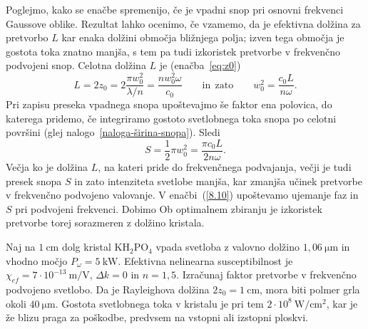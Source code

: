Poglejmo, kako se enačbe spremenijo, če je vpadni snop pri osnovni 
frekvenci Gaussove oblike. 
Rezultat lahko ocenimo, če vzamemo, da je
efektivna dolžina za pretvorbo $L$ kar enaka dolžini območja bližnjega polja; izven tega območja je 
gostota toka znatno manjša, s tem pa tudi izkoristek pretvorbe v 
frekvenčno podvojeni snop.
Celotna  dolžina $L$ je (enačba~\ref{eq:z0})
\begin{equation}
L=2z_{0}=2\frac{\pi w_{0}^{2}}{\lambda/n} = \frac{n w_0^2 \omega}{c_0}  \qquad \mathrm{in~~zato} \qquad 
w_{0}^{2} = \frac{c_0 L}{n \omega}.
\label{SHGG}
\end{equation}
Pri zapisu preseka vpadnega snopa upoštevajmo še faktor ena polovica, do katerega 
pridemo, če integriramo gostoto svetlobnega toka
snopa po celotni površini (glej nalogo~\ref{naloga-širina-snopa}). Sledi
\begin{equation}
S=\frac{1}{2}\pi w_{0}^{2} = \frac{\pi c_0 L}{2 n \omega}.
\end{equation}
Večja ko je dolžina $L$, na kateri pride do frekvenčnega podvajanja, 
večji je tudi presek snopa $S$ in zato intenziteta svetlobe manjša, kar zmanjša
učinek pretvorbe v frekvenčno podvojeno valovanje.
V enačbi~(\ref{8.10}) upoštevamo ujemanje faz in $S$ pri podvojeni frekvenci. Dobimo
Ob optimalnem zbiranju je izkoristek pretvorbe torej sorazmeren z dolžino kristala.
\begin{definition}
Naj na $1~\si{\centi\metre}$ dolg kristal KH$_{2}$PO$_{4}$ vpada svetloba
z valovno dolžino $1,06~\si{\micro\metre}$ in vhodno močjo $P_\omega = 5~\si{\kilo\watt}$.
Efektivna nelinearna susceptibilnost je $\chi_{ef}=7\cdot10^{-13}~\si{\metre/\volt}$, 
$\Delta k=0$ in $n=1,5$. Izračunaj
faktor pretvorbe v frekvenčno podvojeno svetlobo.
Da je Rayleighova dolžina $2z_{0}=1~\si{\centi\metre}$, mora biti polmer
grla okoli $40~\si{\micro\metre}$. Gostota svetlobnega toka v kristalu je pri
tem $2\cdot10^{8}~\si{\watt/\centi\metre^{2}}$, kar je že blizu praga za poškodbe,
predvsem na vstopni ali izstopni ploskvi. 
\end{definition}

